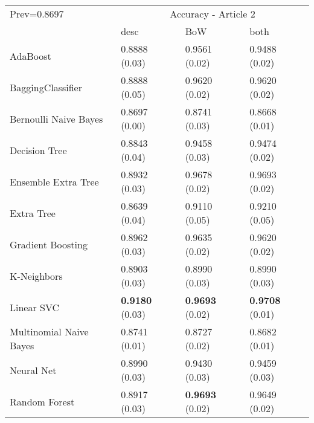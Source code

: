 \begin{tabular}{|l|l|l|l| }
\hline
Prev=0.8697 &  \multicolumn{3}{c|}{Accuracy - Article 2} \\
\cline{2-4} & desc & BoW & both \\ \hline
AdaBoost                & 0.8888 (0.03) & 0.9561 (0.02) & 0.9488 (0.02)\\
BaggingClassifier       & 0.8888 (0.05) & 0.9620 (0.02) & 0.9620 (0.02)\\
Bernoulli Naive Bayes   & 0.8697 (0.00) & 0.8741 (0.03) & 0.8668 (0.01)\\
Decision Tree           & 0.8843 (0.04) & 0.9458 (0.03) & 0.9474 (0.02)\\
Ensemble Extra Tree     & 0.8932 (0.03) & 0.9678 (0.02) & 0.9693 (0.02)\\
Extra Tree              & 0.8639 (0.04) & 0.9110 (0.05) & 0.9210 (0.05)\\
Gradient Boosting       & 0.8962 (0.03) & 0.9635 (0.02) & 0.9620 (0.02)\\
K-Neighbors             & 0.8903 (0.03) & 0.8990 (0.03) & 0.8990 (0.03)\\
Linear SVC              & {\bf 0.9180} (0.03) & {\bf 0.9693} (0.02) & {\bf 0.9708} (0.01)\\
Multinomial Naive Bayes & 0.8741 (0.01) & 0.8727 (0.02) & 0.8682 (0.01)\\
Neural Net              & 0.8990 (0.03) & 0.9430 (0.03) & 0.9459 (0.03)\\
Random Forest           & 0.8917 (0.03) & {\bf 0.9693} (0.02) & 0.9649 (0.02)\\
\hline
\end{tabular}